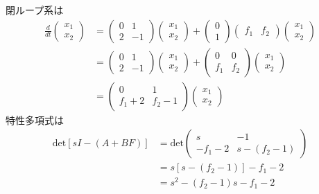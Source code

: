 \documentclass[a4paper,11pt,fleqn]{jreport}
\begin{document}
閉ループ系は
\begin{align*}
	\frac{d}{dt}
	\left (
	\begin{array}{c}
	 x_1 \\ x_2 
	\end{array}
	\right )
	& = 
	\left (
	\begin{array}{cc}
	 0 & 1 \\
	 2 & -1
	\end{array}
	\right )
	\left (
	\begin{array}{c}
	 x_1 \\ x_2 
	\end{array}
	\right )
	+
	\left (
	\begin{array}{c}
	 0 \\ 1 
	\end{array}
	\right )
	\left (
	\begin{array}{cc}
	 f_1 & f_2
	\end{array}
	\right )
	\left (
	\begin{array}{c}
	 x_1 \\ x_2 
	\end{array}
	\right )
\\
	&=
	\left (
	\begin{array}{cc}
	 0 & 1 \\
	 2 & -1
	\end{array}
	\right )
	\left (
	\begin{array}{c}
	 x_1 \\ x_2 
	\end{array}
	\right )
	+
	\left (
	\begin{array}{cc}
	 0   & 0   \\
	 f_1 & f_2
	\end{array}
	\right )
	\left (
	\begin{array}{c}
	 x_1 \\ x_2 
	\end{array}
	\right )
\\
	&=
	\left (
	\begin{array}{cc}
	 0 & 1 \\
	 f_1+2 & f_2-1
	\end{array}
	\right )
	\left (
	\begin{array}{c}
	 x_1 \\ x_2 
	\end{array}
	\right )
\end{align*}
特性多項式は
\begin{align*}
	\mbox{det}[sI-(A+BF)]
	& =
	\mbox{det}
	\left (
	\begin{array}{cc}
	 s & - 1 \\
	 - f_1 -2 & s- (f_2-1)
	\end{array}
	\right )
\\
	&= s [s-(f_2-1)] - f_1 -2
\\
	&= s^2 - (f_2-1) s - f_1 -2
\end{align*}
\end{document}
